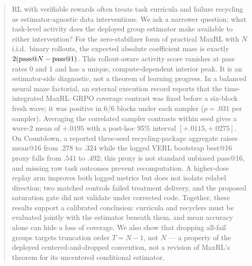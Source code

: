 
\begin{abstract}
RL with verifiable rewards often treats task curricula and failure
recycling as estimator-agnostic data interventions. We ask a narrower
question: what task-level activity does the deployed group estimator
make available to either intervention? For the zero-stabilizer form of
practical MaxRL with $N$ i.i.d.\ binary rollouts, the expected absolute
coefficient mass is exactly
$2(\passat{N}-\passat{1})$. This rollout-aware activity score vanishes
at pass rates $0$ and $1$ and has a unique, compute-dependent interior
peak. It is an estimator-side diagnostic, not a theorem of learning
progress. In a balanced neural maze factorial, an external execution
record reports that the time-integrated MaxRL--GRPO coverage contrast
was fixed before a six-block fresh wave; it was positive in 6/6 blocks
under each sampler ($p{=}.031$ per sampler). Averaging the correlated
sampler contrasts within seed gives a wave-2 mean of $+.0195$ with a
post-hoc 95\% interval $[+.0115,+.0275]$. On Countdown, a reported
three-seed recycling-package aggregate raises mean@16 from $.278$ to
$.324$ while the logged VERL bootstrap best@16 proxy falls from $.541$
to $.492$; this proxy is not standard unbiased pass@16, and missing raw
task outcomes prevent recomputation. A higher-dose replay arm improves
both logged metrics but does not isolate relabel direction; two matched
controls failed treatment delivery, and the proposed saturation gate
did not validate under corrected code. Together, these results support
a calibrated conclusion: curricula and recyclers must be evaluated
jointly with the estimator beneath them, and mean accuracy alone can
hide a loss of coverage. We also show that dropping all-fail groups
targets truncation order $T{=}N{-}1$, not $N$ --- a property of the deployed
centered-and-dropped convention, not a revision of MaxRL's theorem for its
uncentered conditional estimator.
\end{abstract}

\begin{center}\small{}\end{center}

